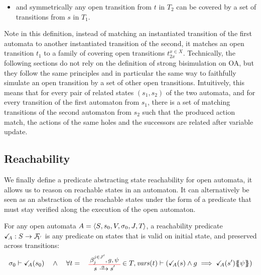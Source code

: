 \documentclass[runningheads]{llncs}
\begin{document}
\begin{definition}
\begin{itemize}
     
 \item  and symmetrically any open transition from $t$ in ${T}_2$ can be 
      covered by a set of transitions from $s$ in ${T}_1$.
 \end{itemize}

 

 \end{definition}
Note in this definition, instead of matching an instantiated transition  of the first automata to another instantiated transition of the second, it matches an open transition $t_1$ to a family of covering open transitions $t_{2x}^{x\in X}$.
Technically, the following sections do not rely on the definition of strong bisimulation on OA, but they follow the same principles and in particular the same way to faithfully simulate an open transition by a set of other open transitions.
Intuitively, this means that for every pair of related
states $(s_1,s_2)$  of the two automata, and for every  transition of the first automaton from $s_1$, there is a set of matching transitions  of the second automaton  from $s_2$ such that the produced action match, the actions of the same holes and the successors are related after variable update.

\subsection{Reachability}
We finally define a predicate abstracting state reachability for open automata, it  allows us to reason on reachable states in an automaton. It can alternatively be seen as an abstraction of the reachable states under the form of a predicate that must stay verified along the execution of the open automaton.
\begin{definition}[Reachability] \label{Def:Reach}
For any open automata \(A = \OAg\), a reachability predicate \(\reach{A}: S \to \rformulas[V]\) is any predicate on states that is valid on initial state, and preserved across transitions:
\[\sigma_0 \vdash \reach{A}\mpar{s_0}\quad\land\quad\forall t = \OTg \in T, \fvars{t} \vdash \left(\reach{A}\mpar{s} \wedge g \implies \reach{A}\mpar{s'}\psubst{\psi}\right)\]
\end{definition}
\end{document}
